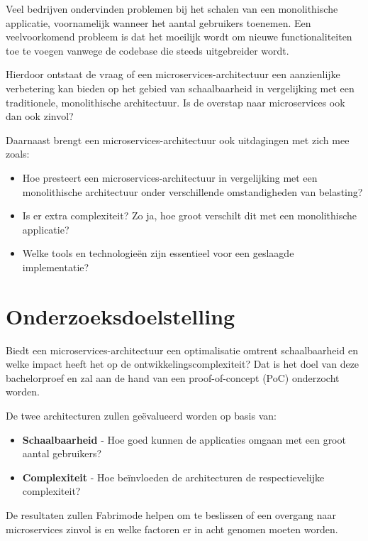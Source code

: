 Veel bedrijven ondervinden problemen bij het schalen van een monolithische applicatie, voornamelijk wanneer het aantal gebruikers toenemen. Een veelvoorkomend probleem is dat het moeilijk wordt om nieuwe functionaliteiten toe te voegen vanwege de codebase die steeds uitgebreider wordt.

Hierdoor ontstaat de vraag of een microservices-architectuur een aanzienlijke verbetering kan bieden op het gebied van schaalbaarheid in vergelijking met een traditionele, monolithische architectuur. Is de overstap naar microservices ook dan ook zinvol?

Daarnaast brengt een microservices-architectuur ook uitdagingen met zich mee zoals:

\begin{itemize}
	\item Hoe presteert een microservices-architectuur in vergelijking met een monolithische architectuur onder verschillende omstandigheden van belasting?
	\item Is er extra complexiteit? Zo ja, hoe groot verschilt dit met een monolithische applicatie?
	\item Welke tools en technologieën zijn essentieel voor een geslaagde implementatie?
\end{itemize}

\section{Onderzoeksdoelstelling}

Biedt een microservices-architectuur een optimalisatie omtrent schaalbaarheid en welke impact heeft het op de ontwikkelingscomplexiteit? Dat is het doel van deze bachelorproef en zal aan de hand van een proof-of-concept (PoC) onderzocht worden.

De twee architecturen zullen geëvalueerd worden op basis van:

\begin{itemize}
	\item \textbf{Schaalbaarheid} - Hoe goed kunnen de applicaties omgaan met een groot aantal gebruikers?
	\item \textbf{Complexiteit} - Hoe beïnvloeden de architecturen de respectievelijke complexiteit?
\end{itemize}

De resultaten zullen Fabrimode helpen om te beslissen of een overgang naar microservices zinvol is en welke factoren er in acht genomen moeten worden.

